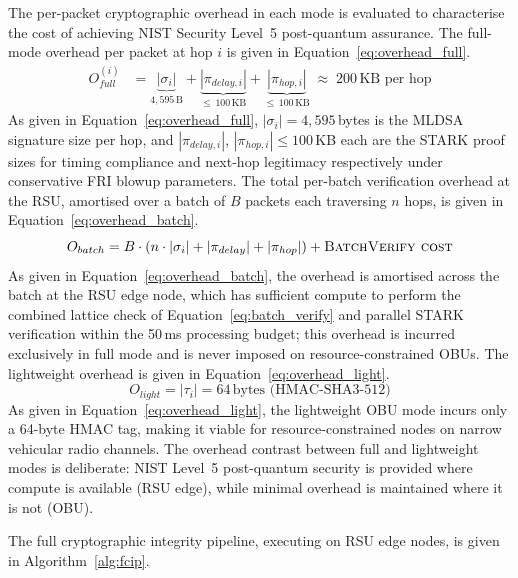 \documentclass[12pt, a4paper]{report}
\begin{document}
The per-packet cryptographic overhead in each mode
is evaluated to characterise the cost of achieving
NIST Security Level~5 post-quantum assurance. The
full-mode overhead per packet at hop $i$ is given
in Equation~\eqref{eq:overhead_full}.
\begin{align}
O_{full}^{(i)} &=
\underbrace{|\sigma_i|}_{4{,}595\,\text{B}}
+ \underbrace{|\pi_{delay,i}|}
  _{\leq\,100\,\text{KB}}
+ \underbrace{|\pi_{hop,i}|}
  _{\leq\,100\,\text{KB}}
\;\approx\; 200\,\text{KB per hop}
\label{eq:overhead_full}
\end{align}
As given in Equation~\eqref{eq:overhead_full},
$|\sigma_i| = 4{,}595$\,bytes is the \ac{MLDSA}
signature size per hop, and $|\pi_{delay,i}|$,
$|\pi_{hop,i}| \leq 100$\,KB each are the
\ac{STARK} proof sizes for timing compliance and
next-hop legitimacy respectively under conservative
FRI blowup parameters. The total per-batch
verification overhead at the \ac{RSU}, amortised
over a batch of $B$ packets each traversing $n$
hops, is given in Equation~\eqref{eq:overhead_batch}.
\begin{equation}
O_{batch} = B \cdot \left(
n \cdot |\sigma_i|
+ |\pi_{delay}| + |\pi_{hop}|
\right)
+ \textsc{BatchVerify cost}
\label{eq:overhead_batch}
\end{equation}
As given in Equation~\eqref{eq:overhead_batch},
the overhead is amortised across the batch at the
\ac{RSU} edge node, which has sufficient compute
to perform the combined lattice check of
Equation~\eqref{eq:batch_verify} and parallel
\ac{STARK} verification within the 50\,ms
processing budget; this overhead is incurred
exclusively in full mode and is never imposed on
resource-constrained \ac{OBU}s. The lightweight
overhead is given in
Equation~\eqref{eq:overhead_light}.
\begin{equation}
O_{light} = |\tau_i| = 64\,\text{bytes
(HMAC-SHA3-512)}
\label{eq:overhead_light}
\end{equation}
As given in Equation~\eqref{eq:overhead_light},
the lightweight \ac{OBU} mode incurs only a
64-byte \ac{HMAC} tag, making it viable for
resource-constrained nodes on narrow vehicular
radio channels. The overhead contrast between full
and lightweight modes is deliberate: NIST Level~5
post-quantum security is provided where compute
is available (RSU edge), while minimal overhead
is maintained where it is not (OBU).




The full cryptographic integrity pipeline, executing
on \ac{RSU} edge nodes, is given in
Algorithm~\ref{alg:fcip}.
\end{document}
